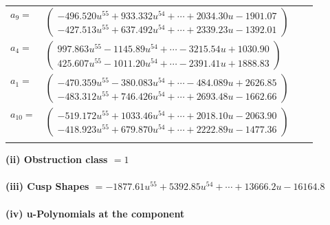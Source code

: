 \documentclass[1p]{elsarticle_modified}
\theoremstyle{definition}
\begin{document}
\begin{tabular}{m{7pt} m{180pt} m{7pt} m{180pt} }
\flushright $a_{9}=$&$\begin{pmatrix}-496.520 u^{55}+933.332 u^{54}+\cdots+2034.30 u-1901.07\\-427.513 u^{55}+637.492 u^{54}+\cdots+2339.23 u-1392.01\end{pmatrix}$ \\
\flushright $a_{4}=$&$\begin{pmatrix}997.863 u^{55}-1145.89 u^{54}+\cdots-3215.54 u+1030.90\\425.607 u^{55}-1011.20 u^{54}+\cdots-2391.41 u+1888.83\end{pmatrix}$ \\
\flushright $a_{1}=$&$\begin{pmatrix}-470.359 u^{55}-380.083 u^{54}+\cdots-484.089 u+2626.85\\-483.312 u^{55}+746.426 u^{54}+\cdots+2693.48 u-1662.66\end{pmatrix}$ \\
\flushright $a_{10}=$&$\begin{pmatrix}-519.172 u^{55}+1033.46 u^{54}+\cdots+2018.10 u-2063.90\\-418.923 u^{55}+679.870 u^{54}+\cdots+2222.89 u-1477.36\end{pmatrix}$\\&\end{tabular}
\flushleft \textbf{(ii) Obstruction class $= 1$}\\~\\
\flushleft \textbf{(iii) Cusp Shapes $= -1877.61 u^{55}+5392.85 u^{54}+\cdots+13666.2 u-16164.8$}\\~\\
\newpage\renewcommand{\arraystretch}{1}
\flushleft \textbf{(iv) u-Polynomials at the component}\newline \\
\end{document}
